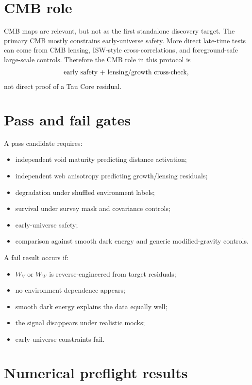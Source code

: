 \documentclass[11pt]{article}
\begin{document}
\section{CMB role}

CMB maps are relevant, but not as the first standalone discovery target. The
primary CMB mostly constrains early-universe safety. More direct late-time
tests can come from CMB lensing, ISW-style cross-correlations, and
foreground-safe large-scale controls. Therefore the CMB role in this protocol is
\[
\hbox{early safety + lensing/growth cross-check},
\]
not direct proof of a Tau Core residual.

\section{Pass and fail gates}

A pass candidate requires:

\begin{itemize}[leftmargin=1.2em]
\item independent void maturity predicting distance activation;
\item independent web anisotropy predicting growth/lensing residuals;
\item degradation under shuffled environment labels;
\item survival under survey mask and covariance controls;
\item early-universe safety;
\item comparison against smooth dark energy and generic modified-gravity controls.
\end{itemize}

A fail result occurs if:

\begin{itemize}[leftmargin=1.2em]
\item \(W_V\) or \(W_W\) is reverse-engineered from target residuals;
\item no environment dependence appears;
\item smooth dark energy explains the data equally well;
\item the signal disappears under realistic mocks;
\item early-universe constraints fail.
\end{itemize}

\section{Numerical preflight results}
\end{document}
